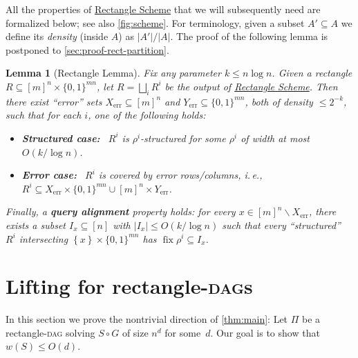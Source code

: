 \documentclass[11pt]{article}
\numberwithin{equation}{section}
\newtheorem{lemma}[theorem]{Lemma}
\theoremstyle{definition}
\theoremstyle{plain}
\newcommand{\ie}{i.\,e.}
\newcommand{\rectscheme}{\hyperref[alg:partition]{Rectangle Scheme}\xspace}
\DeclareMathOperator{\fix}{fix}
\DeclareMathOperator{\err}{err}
\newcommand{\DAGs}{\textsc{dag}s\xspace}
\newcommand{\DAGspace}{\textsc{dag}\xspace}
\newcommand{\allX}{[m]^n}
\newcommand{\allY}{\{0,1\}^{mn}}
\newcommand{\set}[1]{\left \{ #1 \right \}}
\begin{document}
All the properties of \rectscheme that we will subsequently need are formalized below; see also \autoref{fig:scheme}. For terminology, given a subset $A'\subseteq A$ we define its \emph{density} (inside $A$) as $|A'|/|A|$. The proof of the following lemma is postponed to \autoref{sec:proof-rect-partition}.

\begin{lemma}[Rectangle Lemma] \label{lem:scheme}  %
\em Fix any parameter $k \leq n \log n$. Given a rectangle $R\subseteq \allX\times\allY$, let $R=\bigsqcup_i R^i$ be the output of \rectscheme. Then there exist ``error'' sets $X_{\err}\subseteq \allX$ and $Y_{\err}\subseteq\allY$, both of density $\leq 2^{-k}$, such that for each $i$, one of the following holds:
\begin{itemize}[label=$\bullet$,itemsep=1mm]
\item {\bf\slshape Structured case:}~ $R^i$ is $\rho^i$-structured for some $\rho^i$ of width at most $O(k/\log n)$.
\item {\bf\slshape Error case:}~ $R^i$ is covered by error rows/columns, \ie, $R^i\subseteq X_{\err}\times \allY\cup \allX\times Y_{\err}$.
\end{itemize}
Finally, a {\bf\itshape query alignment} property holds: for every $x \in \allX\smallsetminus X_{\err}$, there exists a subset $I_x \subseteq [n]$ with $|I_x| \le O(k/\log n)$ such that every ``structured'' $R^i$ intersecting $\set{x} \times \allY$ has $\fix \rho^i \subseteq I_x$.
\end{lemma}


\section{Lifting for rectangle-\DAGs} \label{sec:proof-rect}

In this section we prove the nontrivial direction of \autoref{thm:main}: Let $\Pi$ be a rectangle-\DAGspace solving $S\circ G$ of size $n^d$ for some~$d$. Our goal is to show that $w(S)\leq O(d)$.
\end{document}
